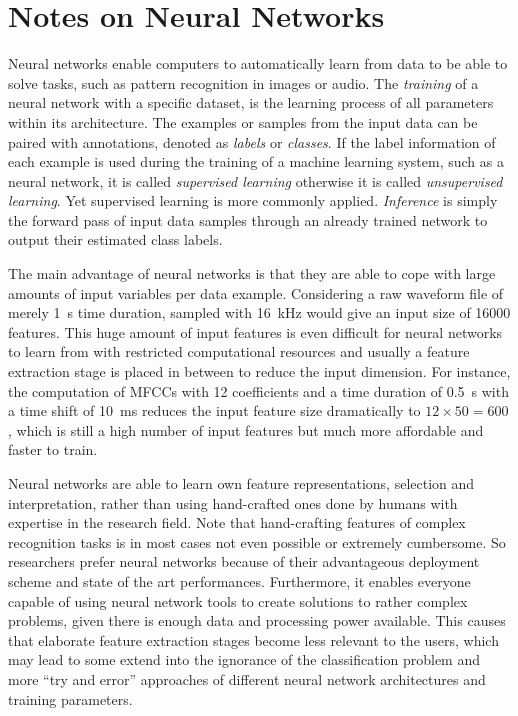 
\section{Notes on Neural Networks}\label{sec:intro_nn}
Neural networks enable computers to automatically learn from data to be able to solve tasks, such as pattern recognition in images or audio.
The \emph{training} of a neural network with a specific dataset, is the learning process of all parameters within its architecture.
The examples or samples from the input data can be paired with annotations, denoted as \emph{labels} or \emph{classes}.
If the label information of each example is used during the training of a machine learning system, such as a neural network, it is called \emph{supervised learning} otherwise it is called \emph{unsupervised learning}.
Yet supervised learning is more commonly applied.
\emph{Inference} is simply the forward pass of input data samples through an already trained network to output their estimated class labels.

The main advantage of neural networks is that they are able to cope with large amounts of input variables per data example.
Considering a raw waveform file of merely \SI{1}{s} time duration, sampled with \SI{16}{\kilo\hertz} would give an input size of 16000 features.
This huge amount of input features is even difficult for neural networks to learn from with restricted computational resources and usually a feature extraction stage is placed in between to reduce the input dimension.
For instance, the computation of MFCCs with 12 coefficients and a time duration of \SI{0.5}{s} with a time shift of \SI{10}{\milli\second} reduces the input feature size dramatically to $12 \times 50 = 600$, which is still a high number of input features but much more affordable and faster to train.

Neural networks are able to learn own feature representations, selection and interpretation, rather than using hand-crafted ones done by humans with expertise in the research field.
Note that hand-crafting features of complex recognition tasks is in most cases not even possible or extremely cumbersome.
So researchers prefer neural networks because of their advantageous deployment scheme and state of the art performances.
Furthermore, it enables everyone capable of using neural network tools to create solutions to rather complex problems, given there is enough data and processing power available.
This causes that elaborate feature extraction stages become less relevant to the users, which may lead to some extend into the ignorance of the classification problem and more \enquote{try and error} approaches of different neural network architectures and training parameters.

